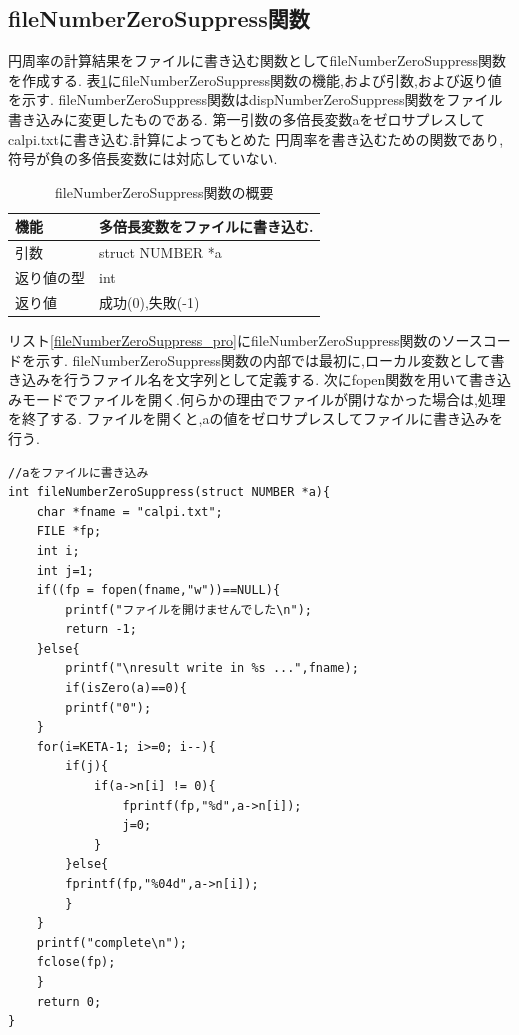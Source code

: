 \documentclass[a4j] {jarticle}
\begin{document}
\subsection{fileNumberZeroSuppress関数}
円周率の計算結果をファイルに書き込む関数としてfileNumberZeroSuppress関数を作成する.
表\ref{fileNumberZeroSuppress}にfileNumberZeroSuppress関数の機能,および引数,および返り値を示す.
fileNumberZeroSuppress関数はdispNumberZeroSuppress関数をファイル書き込みに変更したものである.
第一引数の多倍長変数aをゼロサプレスしてcalpi.txtに書き込む.計算によってもとめた
円周率を書き込むための関数であり,符号が負の多倍長変数には対応していない.
\begin{table}[H]
  \caption{fileNumberZeroSuppress関数の概要}
  \label{fileNumberZeroSuppress}
  \begin{center}
      \begin{tabular}{|l|l|}\hline
      機能 & 多倍長変数をファイルに書き込む.\\ \hline
      引数 & struct NUMBER *a\\ \hline
      返り値の型 & int\\ \hline
      返り値 & 成功(0),失敗(-1)\\ \hline
      \end{tabular}
  \end{center}
  \end{table}

  リスト\ref{fileNumberZeroSuppress_pro}にfileNumberZeroSuppress関数のソースコードを示す.
  fileNumberZeroSuppress関数の内部では最初に,ローカル変数として書き込みを行うファイル名を文字列として定義する.
  次にfopen関数を用いて書き込みモードでファイルを開く.何らかの理由でファイルが開けなかった場合は,処理を終了する.
  ファイルを開くと,aの値をゼロサプレスしてファイルに書き込みを行う.
  \begin{lstlisting}[basicstyle=\ttfamily\footnotesize, frame=single,label=fileNumberZeroSuppress_pro,caption=fileNumberZeroSuppress関数のソースコード]
//aをファイルに書き込み
int fileNumberZeroSuppress(struct NUMBER *a){
    char *fname = "calpi.txt";
    FILE *fp;
    int i;
    int j=1;
    if((fp = fopen(fname,"w"))==NULL){
        printf("ファイルを開けませんでした\n");
        return -1;
    }else{
        printf("\nresult write in %s ...",fname);
        if(isZero(a)==0){
        printf("0");
    }
    for(i=KETA-1; i>=0; i--){
        if(j){
            if(a->n[i] != 0){
                fprintf(fp,"%d",a->n[i]);
                j=0;
            }
        }else{
        fprintf(fp,"%04d",a->n[i]);
        }
    }
    printf("complete\n");
    fclose(fp);
    }
    return 0;
}
\end{lstlisting}
\end{document}
